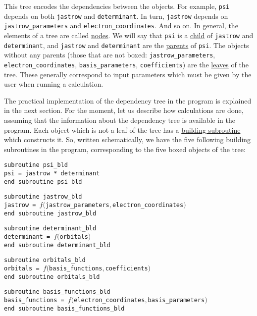 \documentclass[a4paper,11pt]{article}
\newcommand\Def[1]{\underline{#1}}
\begin{document}
This tree encodes the dependencies between the objects.
For example, {\tt psi} depends on both {\tt jastrow} and {\tt determinant}.
In turn, {\tt jastrow} depends on {\tt jastrow_parameters} and {\tt electron_coordinates}. And so on.
In general, the elements of a tree are called \Def{nodes}.
We will say that {\tt psi} is a \Def{child} of {\tt jastrow} and {\tt determinant},
and {\tt jastrow} and {\tt determinant} are the \Def{parents} of {\tt psi}.
The objects without any parents (those that are not boxed: {\tt jastrow_parameters}, {\tt electron_coordinates}, {\tt basis_parameters}, {\tt coefficients}) are the \Def{leaves} of the tree.
These generally correspond to input parameters which must be given by the user when running a calculation.

\vspace{1em}
The practical implementation of the dependency tree in the program is explained in the next section. For the moment, let us describe how calculations are done, assuming that the information about the dependency tree is available in the program.
Each object which is not a leaf of the tree has a \Def{building subroutine} which constructs it. So, written schematically, we have the five following building subroutines in the program, corresponding to the five boxed objects of the tree:

\vspace{0.5cm}
\noindent
{\tt subroutine psi_bld\\
psi = jastrow * determinant\\
end subroutine psi_bld}

\vspace{0.5cm}
\noindent
{\tt subroutine jastrow_bld\\
jastrow  = $f(${\tt jastrow_parameters}$,${\tt electron_coordinates}$)$\\
end subroutine jastrow_bld}

\vspace{0.5cm}
\noindent
{\tt subroutine determinant_bld\\
determinant  = $f(${\tt orbitals}$)$\\
end subroutine determinant_bld}

\vspace{0.5cm}
\noindent
{\tt subroutine orbitals_bld\\
orbitals  = $f(${\tt basis_functions}$,${\tt coefficients}$)$\\
end subroutine orbitals_bld}

\vspace{0.5cm}
\noindent
{\tt subroutine basis_functions_bld\\
basis_functions  = $f(${\tt electron_coordinates}$,${\tt basis_parameters}$)$\\
end subroutine basis_functions_bld}
\end{document}
